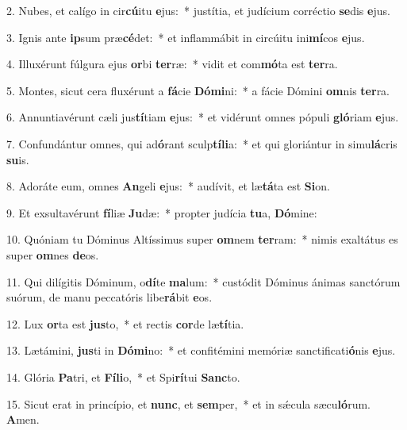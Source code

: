 2. Nubes, et calígo in cir\textbf{cú}itu \textbf{e}jus:~*  justítia, et judícium corréctio \textbf{se}dis \textbf{e}jus.\

3. Ignis ante \textbf{ip}sum præ\textbf{cé}det:~*  et inflammábit in circúitu ini\textbf{mí}cos \textbf{e}jus.\

4. Illuxérunt fúlgura ejus \textbf{or}bi \textbf{ter}ræ:~*  vidit et com\textbf{mó}ta est \textbf{ter}ra.\

5. Montes, sicut cera fluxérunt a \textbf{fá}cie \textbf{Dó}\textbf{mi}ni:~*  a fácie Dómini \textbf{om}nis \textbf{ter}ra.\

6. Annuntiavérunt cæli jus\textbf{tí}tiam \textbf{e}jus:~*  et vidérunt omnes pópuli \textbf{gló}riam \textbf{e}jus.\

7. Confundántur omnes, qui ad\textbf{ó}rant sculp\textbf{tí}\textbf{li}a:~*  et qui gloriántur in simu\textbf{lá}cris \textbf{su}is.\

8. Adoráte eum, omnes \textbf{An}geli \textbf{e}jus:~*  audívit, et læ\textbf{tá}ta est \textbf{Si}on.\

9. Et exsultavérunt \textbf{fí}liæ \textbf{Ju}dæ:~*  propter judícia \textbf{tu}a, \textbf{Dó}mine:\

10. Quóniam tu Dóminus Altíssimus super \textbf{om}nem \textbf{ter}ram:~*  nimis exaltátus es super \textbf{om}nes \textbf{de}os.\

11. Qui dilígitis Dóminum, o\textbf{dí}te \textbf{ma}lum:~*  custódit Dóminus ánimas sanctórum suórum, de manu peccatóris libe\textbf{rá}bit \textbf{e}os.\

12. Lux \textbf{or}ta est \textbf{jus}to,~*  et rectis \textbf{cor}de læ\textbf{tí}tia.\

13. Lætámini, \textbf{jus}ti in \textbf{Dó}\textbf{mi}no:~*  et confitémini memóriæ sanctificati\textbf{ó}nis \textbf{e}jus.\

14. Glória \textbf{Pa}tri, et \textbf{Fí}\textbf{li}o,~*  et Spi\textbf{rí}tui \textbf{Sanc}to.\

15. Sicut erat in princípio, et \textbf{nunc}, et \textbf{sem}per,~*  et in sǽcula sæcu\textbf{ló}rum. \textbf{A}men.\

